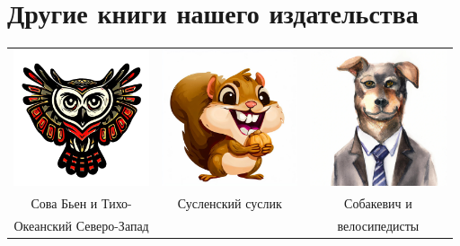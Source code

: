 \documentclass[a5paper,11pt]{memoir}
\begin{document}



\cleartoverso
\thispagestyle{empty}  %


\section*{Другие книги нашего издательства}

\begin{table}[h]
\begin{tabular}{ccc}
\includegraphics[height=4cm]{images/cava-bien} & \includegraphics[height=4cm]{images/suslik} & \includegraphics[height=4cm]{images/sobachevich}             \\
 Сова Бьен и Тихо-  &  Сусленский суслик        &   Собакевич и            \\
 Океанский Северо-Запад           &          &    велосипедисты          \\

\end{tabular}
\end{table}
\end{document}
